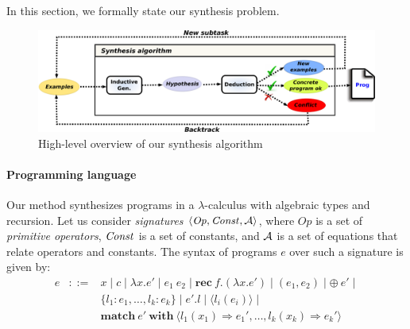 In this section, we formally state our synthesis problem. 

\newcommand{\Op}{\mathit{Op}}
\newcommand{\of}{\mathbf{of}}
\newcommand{\matchc}{\mathbf{match}}
\newcommand{\withc}{\mathbf{with}}
\newcommand{\zug}[1]{\langle  #1 \rangle}
\newcommand{\rec}{\mathbf{rec}}


\begin{figure}[t]
\vspace{-0.15in}
\begin{center}
\includegraphics[scale=0.37]{overview-modified3.pdf}
\end{center}
\caption{High-level overview of our synthesis
  algorithm}\label{fig:overview}
\vspace{-0.1in}
\end{figure}

\paragraph{Programming language} 

Our method synthesizes programs in a $\lambda$-calculus with algebraic
types and recursion. Let us consider {\em signatures} $\zug{\Op,
  \id{Const}, \cal{A}}$, where $\Op$ is a set of {\em primitive
  operators}, $\mathit{Const}$ is a set of constants, and $\cal{A}$ is a
set of equations that relate operators and constants.  The syntax of
programs $e$ over such a signature is given by:
\begin{eqnarray*} e & ::= & x \mid c \mid \lambda x. e' \mid e_1~e_2 \mid \rec~f.(\lambda x. e')
 \mid (e_1,e_2) \mid \oplus~e' \mid \\
 & & \{ l_1: e_1,\dots, l_k: e_k \} \mid e'.l \mid \zug{l_i(e_i)} \mid \\
  & & \matchc~e'~\withc~\zug{l_1(x_1) \Rightarrow
    e_1',\dots, l_k(x_k) \Rightarrow
    e_k'} 
\end{eqnarray*}

